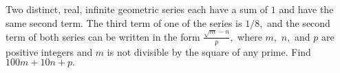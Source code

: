 Two distinct, real, infinite geometric series each have a sum of $1$ and have the same second term. The third term of one of the series is $1/8,$ and the second term of both series can be written in the form $\frac{\sqrt{m}-n}{p},$ where $m,$ $n,$ and $p$ are positive integers and $m$ is not divisible by the square of any prime. Find $100m+10n+p.$